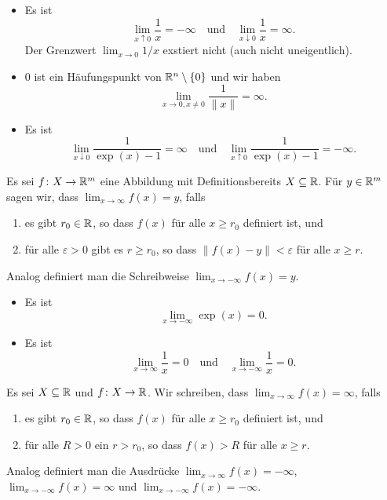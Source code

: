 \documentclass[a4paper,10pt]{article}
\begin{document}
\begin{bsp}
 \begin{itemize}
  \item
   Es ist
   \[
    \lim_{x \uparrow 0} \frac{1}{x} = -\infty
    \quad
    \text{und}
    \quad
    \lim_{x \downarrow 0} \frac{1}{x} = \infty.
   \]
   Der Grenzwert $\lim_{x \to 0} 1/x$ exstiert nicht (auch nicht uneigentlich).
  \item
   $0$ ist ein Häufungspunkt von $\mathbb{R}^n \setminus \{0\}$ und wir haben
   \[
    \lim_{x \to 0, x \neq 0} \frac{1}{\|x\|} = \infty.
   \]
  \item
   Es ist
   \[
    \lim_{x \downarrow 0} \frac{1}{\exp(x) - 1} = \infty
    \quad
    \text{und}
    \quad
    \lim_{x \uparrow 0} \frac{1}{\exp(x) - 1} = -\infty.
   \]
 \end{itemize}
\end{bsp}


\begin{defi}
 Es sei $f \colon X \to \mathbb{R}^m$ eine Abbildung mit Definitionsbereits $X \subseteq \mathbb{R}$. Für $y \in \mathbb{R}^m$ sagen wir, dass $\lim_{x \to \infty} f(x) = y$, falls
 \begin{enumerate}
  \item
   es gibt $r_0 \in \mathbb{R}$, so dass $f(x)$ für alle $x \geq r_0$ definiert ist, und
  \item
   für alle $\varepsilon > 0$ gibt es $r \geq r_0$, so dass $\|f(x) - y\| < \varepsilon$ für alle $x \geq r$.
 \end{enumerate}
 Analog definiert man die Schreibweise $\lim_{x \to -\infty} f(x) = y$.
\end{defi}


\begin{bsp}
 \begin{itemize}
  \item
   Es ist
   \[
    \lim_{x \to -\infty} \exp(x) = 0.
   \]
  \item
   Es ist
   \[
    \lim_{x \to \infty} \frac{1}{x} = 0
    \quad
    \text{und}
    \quad
    \lim_{x \to -\infty} \frac{1}{x} = 0.
   \]
 \end{itemize}
\end{bsp}


\begin{defi}
 Es sei $X \subseteq \mathbb{R}$ und $f \colon X \to \mathbb{R}$. Wir schreiben, dass $\lim_{x \to \infty} f(x) = \infty$, falls
 \begin{enumerate}
  \item
   es gibt $r_0 \in \mathbb{R}$, so dass $f(x)$ für alle $x \geq r_0$ definiert ist, und
  \item
   für alle $R > 0$ ein $r > r_0$, so dass $f(x) > R$ für alle $x \geq r$.
 \end{enumerate}
 Analog definiert man die Ausdrücke $\lim_{x \to \infty} f(x) = -\infty$, $\lim_{x \to -\infty} f(x) = \infty$ und $\lim_{x \to -\infty} f(x) = -\infty$. 
\end{defi}
\end{document}
